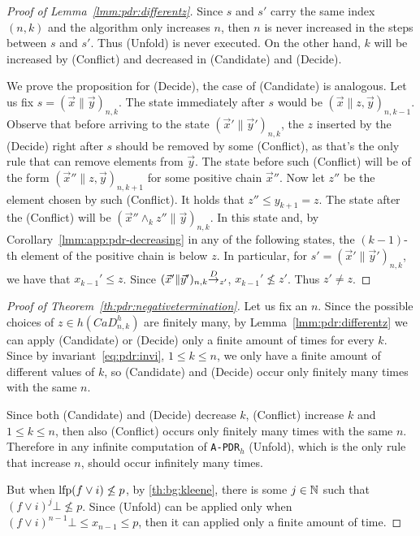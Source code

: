 \begin{proof}[Proof of Lemma~\ref{lmm:pdr:differentz}]
	Since $s$ and $s'$ carry the same index $(n, k)$ and the algorithm only increases $n$, then $n$ is never increased in the steps between $s$ and $s'$. Thus (Unfold) is never executed. On the other hand, $k$ will be increased by (Conflict) and decreased in (Candidate) and (Decide).

	We prove the proposition for (Decide), the case of (Candidate) is analogous. Let us fix $s=( \vec{x} \| \vec{y} )_{n,k}$. The state immediately after $s$ would be $( \vec{x} \| z, \vec{y} )_{n,k-1}$.
	Observe that before arriving to the state $( \vec{x}' \| \vec{y}' )_{n,k}$,  the $z$ inserted by the (Decide) right after $s$ should be removed by some (Conflict), as that's the only rule that can remove elements from $\vec{y}$.
	The state before such (Conflict) will be of the form $(\vec{x}'' \| z, \vec{y} )_{n,k+1}$ for some positive chain $\vec{x}''$. Now let $z''$ be the element chosen by such (Conflict). It holds that $z'' \leq y_{k+1} = z$. The state after the (Conflict) will be $(\vec{x}''\land_k z'' \| \vec{y} )_{n,k}$. In this state and, by Corollary~\ref{lmm:app:pdr-decreasing} in any of the following states, the $(k-1)$-th element of the positive chain is below $z$. In particular, for $s'=( \vec{x}' \| \vec{y}' )_{n,k}$, we have that $x_{k-1}' \leq z$. Since $( \vec{x}' \| \vec{y}' )_{n,k} {\stackrel{D}{\to}}_{z'} $, $x_{k-1}'\not \leq z'$. Thus $z' \neq z$.
\end{proof}

\begin{proof}[Proof of Theorem~\ref{th:pdr:negativetermination}]
	Let us fix an $n$. Since the possible choices of $z\in h(\mathit{CaD}^h_{n,k})$ are finitely many, by Lemma~\ref{lmm:pdr:differentz}  we can apply (Candidate) or (Decide) only a finite amount of times for every $k$.
	Since by invariant~\eqref{eq:pdr:invi}, $1 \le k \le n$, we only have a finite amount of different values of $k$, so (Candidate) and (Decide) occur only finitely many times with the same $n$.

	Since both (Candidate) and (Decide) decrease $k$, (Conflict) increase $k$ and $1 \le k \le n$, then also (Conflict) occurs only finitely many times with the same $n$.
	Therefore in any infinite computation of \texttt{A-PDR}$_h$ (Unfold), which is the only rule that increase $n$, should occur infinitely many times.

	But when $\text{lfp} (f \lor i) \not\leq p$, by \eqref{th:bg:kleene}, there is some $j\in \mathbb{N}$ such that $(f \lor i)^{j} \bot \not\leq p$. Since (Unfold) can be applied only when $(f \lor i)^{n-1} \bot \leq x_{n-1} \leq p$, then it can applied only a finite amount of time.
\end{proof}

